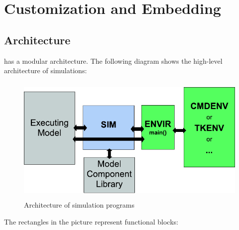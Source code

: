 \chapter{Customization and Embedding}
\label{cha:opp-design}

\section{Architecture}

{\opp} has a modular architecture. The following diagram shows the
high-level architecture of {\opp} simulations:

\begin{figure}[htbp]
  \begin{center}
    \includegraphics[width=4.757in, height=2.412in]{figures/usmanFig18}
    \caption{Architecture of {\opp} simulation programs}
  \end{center}
\end{figure}

The rectangles in the picture represent functional blocks:

